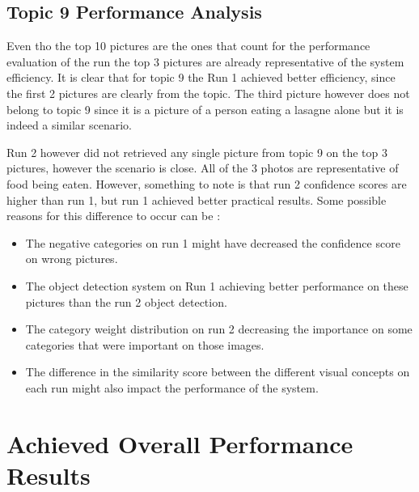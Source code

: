   \subsection{Topic 9 Performance Analysis}

  Even tho the top 10 pictures are the ones that count for the performance evaluation of the run the top 3 pictures are already representative of the system efficiency. It is clear that for topic 9 the Run 1 achieved better efficiency, since the first 2 pictures are clearly from the topic. The third picture however does not belong to topic 9 since it is a picture of a person eating a lasagne alone but it is indeed a similar scenario.
  
  Run 2 however did not retrieved any single picture from topic 9 on the top 3 pictures, however the scenario is close. All of the 3 photos are representative of food being eaten. However, something to note is that run 2 confidence scores are higher than run 1, but run 1 achieved better practical results. Some possible reasons for this difference to occur can be :

  \begin{itemize}
    \itemsep0em
    \item The negative categories on run 1 might have decreased the confidence score on wrong pictures.
    \item The object detection system on Run 1 achieving better performance on these pictures than the run 2 object detection.
    \item The category weight distribution on run 2 decreasing the importance on some categories that were important on those images.
    \item The difference in the similarity score between the different visual concepts on each run might also impact the performance of the system.
  \end{itemize}



\section{Achieved Overall Performance Results}
\label{sec:perfomance_results}

